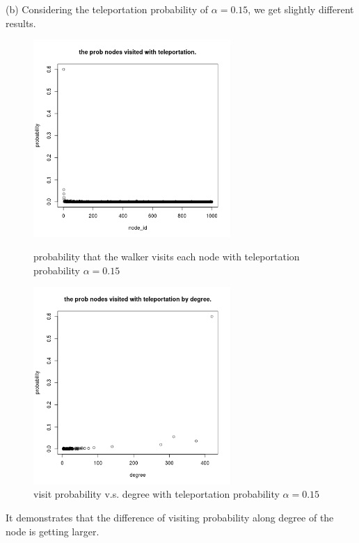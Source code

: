 \documentclass[draftcls,12pt,onecolumn]{IEEEtran}
\begin{document}
(b) Considering the teleportation probability of $\alpha = 0.15$, we get slightly different results. 
\begin{figure}[htbp]
\centering
\begin{minipage}[t]{0.48\textwidth}
\centering
\includegraphics[width=7.5cm]{3_b_rw_prob_teleport.png}
\caption{probability that the walker visits each node with teleportation probability $\alpha = 0.15$}
\end{minipage}
\begin{minipage}[t]{0.48\textwidth}
\centering
\includegraphics[width=7.5cm]{3_b_rw_prob_teleport_by_degree.png}
\caption{visit probability v.s. degree with teleportation probability $\alpha = 0.15$}
\end{minipage}
\end{figure}
It demonstrates that the difference of visiting probability along degree of the node is getting larger. 
\end{document}
